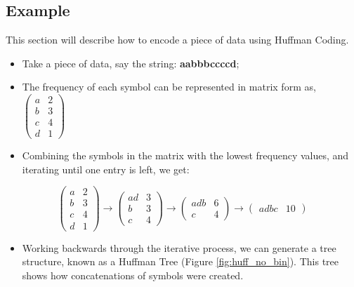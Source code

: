 \documentclass[12pt]{article}
\begin{document}
	\subsection{Example}
	This section will describe how to encode a piece of data using Huffman Coding.
	
	\begin{itemize}
		\item Take a piece of data, say the string: \textbf{aabbbccccd};
		
		\item The frequency of each symbol can be represented in matrix form as,		
		$\begin{pmatrix}
			a & 2 \\
			b & 3 \\
			c & 4 \\
			d & 1
		\end{pmatrix}$
	\end{itemize}
	\begin{itemize}
		\item Combining the symbols in the matrix with the lowest frequency values, and iterating until one entry is left, we get:
	\end{itemize}
	\begin{equation*}
		\begin{pmatrix}
		a & 2 \\
		b & 3 \\
		c & 4 \\
		d & 1
		\end{pmatrix}
		\rightarrow
		\begin{pmatrix}
		ad & 3 \\
		b & 3 \\
		c & 4 
		\end{pmatrix}
		\rightarrow
		\begin{pmatrix}
		adb & 6 \\
		c & 4 
		\end{pmatrix}
		\rightarrow
		\begin{pmatrix}
		adbc & 10
		\end{pmatrix}
	\end{equation*}
	\begin{itemize}
		\item Working backwards through the iterative process, we can generate a tree structure, known as a Huffman Tree (Figure \ref{fig:huff_no_bin}). This tree shows how concatenations of symbols were created.
	\end{itemize}
\end{document}
